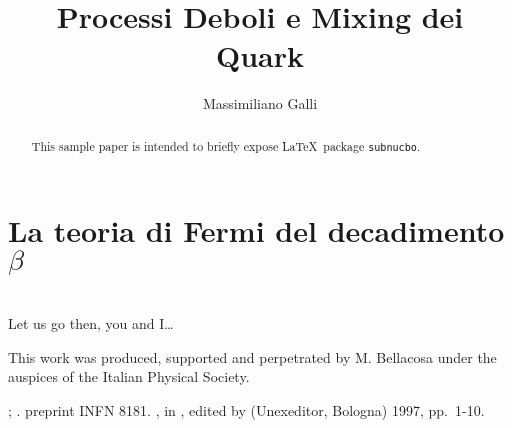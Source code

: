 \documentclass{subnucbo}
\title{Processi Deboli e Mixing dei Quark}
\author{Massimiliano Galli}
\begin{document}
\maketitle

\begin{abstract}
This sample paper is intended to briefly expose \LaTeX\ package \texttt{subnucbo}.
\end{abstract}

\section{La teoria di Fermi del decadimento $\beta$}

\appendix

\section{}
Let us go then, you and I\ldots

\acknowledgments
This work was produced, supported and perpetrated by M. Bellacosa under
the auspices of the Italian Physical Society.

\begin{thebibliography}{0}
 
  ;
  .
 
  preprint INFN 8181.
 
  ,
  in ,
                  edited by 
                  (Unexeditor, Bologna) 1997, pp.~1-10.
\end{thebibliography}
\end{document}
